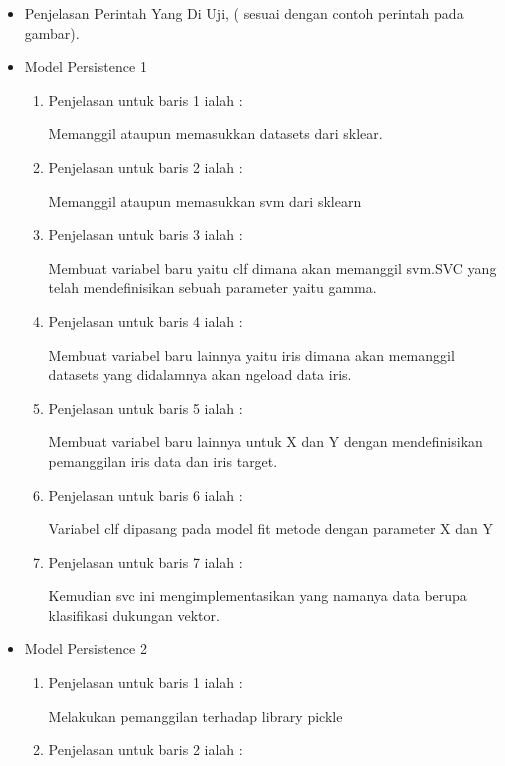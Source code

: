 \begin{itemize}
\begin{itemize}
\par
\item Penjelasan Perintah Yang Di Uji, ( sesuai dengan contoh perintah pada gambar).
\item Model Persistence 1
\begin{enumerate}
\item Penjelasan untuk baris 1 ialah : 
\par Memanggil ataupun memasukkan datasets dari sklear.
\par
\par
\item Penjelasan untuk baris 2 ialah :
\par Memanggil ataupun memasukkan svm dari sklearn
\par
\item Penjelasan untuk baris 3 ialah :
\par Membuat variabel baru yaitu clf dimana akan memanggil svm.SVC yang telah mendefinisikan sebuah parameter yaitu gamma.
\par
\item Penjelasan untuk baris 4 ialah :
\par Membuat variabel baru lainnya yaitu iris dimana akan memanggil datasets yang didalamnya akan ngeload data iris.
\par
\item Penjelasan untuk baris 5 ialah :
\par Membuat variabel baru lainnya untuk X dan Y dengan mendefinisikan pemanggilan iris data dan iris target.
\par
\item Penjelasan untuk baris 6 ialah :
\par Variabel clf dipasang pada model fit metode dengan parameter X dan Y
\par
\item Penjelasan untuk baris 7 ialah : 
\par Kemudian svc ini mengimplementasikan yang namanya data berupa klasifikasi dukungan vektor.
\par
\par
\end{enumerate}
\item Model Persistence 2
\begin{enumerate}
\item Penjelasan untuk baris 1  ialah :
\par Melakukan pemanggilan terhadap library pickle
\par
\item Penjelasan untuk baris 2 ialah :

\end{enumerate}
\end{itemize}
\end{itemize}
